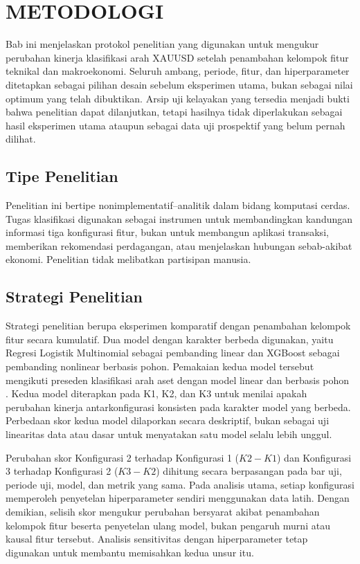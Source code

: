 \chapter{METODOLOGI}

Bab ini menjelaskan protokol penelitian yang digunakan untuk mengukur perubahan kinerja klasifikasi arah XAUUSD setelah penambahan kelompok fitur teknikal dan makroekonomi. Seluruh ambang, periode, fitur, dan hiperparameter ditetapkan sebagai pilihan desain sebelum eksperimen utama, bukan sebagai nilai optimum yang telah dibuktikan. Arsip uji kelayakan yang tersedia menjadi bukti bahwa penelitian dapat dilanjutkan, tetapi hasilnya tidak diperlakukan sebagai hasil eksperimen utama ataupun sebagai data uji prospektif yang belum pernah dilihat.

\section{Tipe Penelitian}

Penelitian ini bertipe nonimplementatif--analitik dalam bidang komputasi cerdas. Tugas klasifikasi digunakan sebagai instrumen untuk membandingkan kandungan informasi tiga konfigurasi fitur, bukan untuk membangun aplikasi transaksi, memberikan rekomendasi perdagangan, atau menjelaskan hubungan sebab-akibat ekonomi. Penelitian tidak melibatkan partisipan manusia.

\section{Strategi Penelitian}

Strategi penelitian berupa eksperimen komparatif dengan penambahan kelompok fitur secara kumulatif. Dua model dengan karakter berbeda digunakan, yaitu Regresi Logistik Multinomial sebagai pembanding linear dan XGBoost sebagai pembanding nonlinear berbasis pohon. Pemakaian kedua model tersebut mengikuti preseden klasifikasi arah aset dengan model linear dan berbasis pohon \parencite{sadorsky2021predicting,basher2022forecasting}. Kedua model diterapkan pada K1, K2, dan K3 untuk menilai apakah perubahan kinerja antarkonfigurasi konsisten pada karakter model yang berbeda. Perbedaan skor kedua model dilaporkan secara deskriptif, bukan sebagai uji linearitas data atau dasar untuk menyatakan satu model selalu lebih unggul.

Perubahan skor Konfigurasi 2 terhadap Konfigurasi 1 ($K2-K1$) dan Konfigurasi 3 terhadap Konfigurasi 2 ($K3-K2$) dihitung secara berpasangan pada bar uji, periode uji, model, dan metrik yang sama. Pada analisis utama, setiap konfigurasi memperoleh penyetelan hiperparameter sendiri menggunakan data latih. Dengan demikian, selisih skor mengukur perubahan bersyarat akibat penambahan kelompok fitur beserta penyetelan ulang model, bukan pengaruh murni atau kausal fitur tersebut. Analisis sensitivitas dengan hiperparameter tetap digunakan untuk membantu memisahkan kedua unsur itu.

